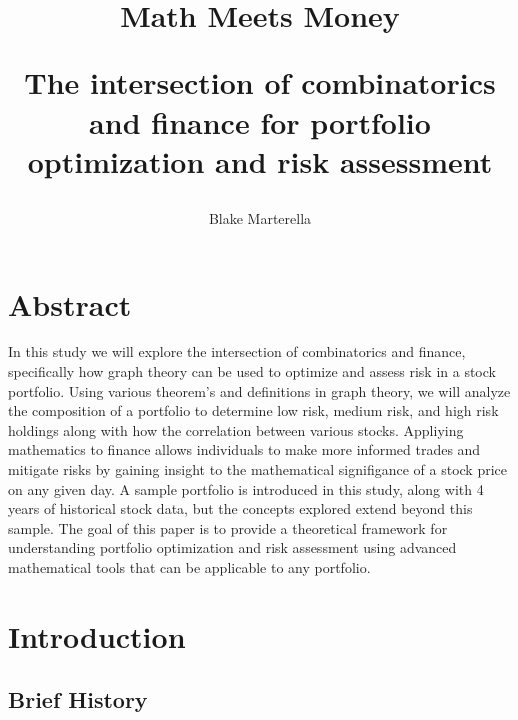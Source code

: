 \documentclass{article}
\begin{document}
\title{
 Math Meets Money \\ 
\begin{large} 
The intersection of combinatorics and finance for portfolio optimization and risk assessment
\end{large} }
\author{Blake Marterella}
\date{}

\maketitle

\section*{Abstract}

In this study we will explore the intersection of combinatorics and finance, specifically how graph theory can be used to optimize and assess risk in a stock portfolio. Using various theorem's and definitions in graph theory, we will analyze the composition of a portfolio to determine low risk, medium risk, and high risk holdings along with how the correlation between various stocks. Appliying mathematics to finance allows individuals to make more informed trades and mitigate risks by gaining insight to the mathematical signifigance of a stock price on any given day. A sample portfolio is introduced in this study, along with 4 years of historical stock data, but the concepts explored extend beyond this sample. The goal of this paper is to provide a theoretical framework for understanding portfolio optimization and risk assessment using advanced mathematical tools that can be applicable to any portfolio.

\tableofcontents

\section{Introduction}

\subsection{Brief History}
\end{document}
